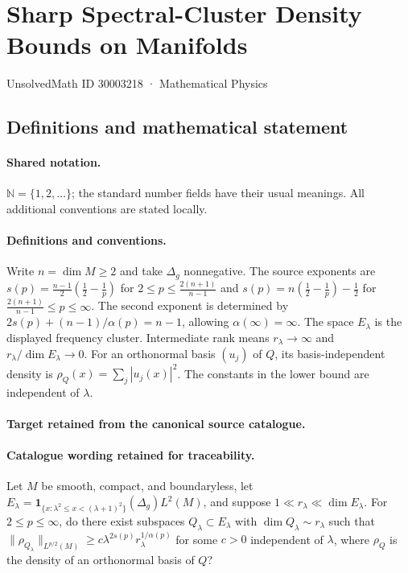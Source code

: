 \documentclass[11pt]{article}
\begin{document}
\setcounter{section}{30003217}
\section{Sharp Spectral-Cluster Density Bounds on Manifolds}\label{30003218}
{\small UnsolvedMath ID 30003218 · Mathematical Physics}
\subsection{Definitions and mathematical statement}

\paragraph{Shared notation.}$\mathbb N=\{1,2,\ldots\}$; the standard number fields have their usual meanings. All additional conventions are stated locally.


\paragraph{Definitions and conventions.}
Write $n=\dim M\geq2$ and take $\Delta_g$ nonnegative. The source exponents are $s(p)=\frac{n-1}{2}(\frac12-\frac1p)$ for $2\leq p\leq\frac{2(n+1)}{n-1}$ and $s(p)=n(\frac12-\frac1p)-\frac12$ for $\frac{2(n+1)}{n-1}\leq p\leq\infty$. The second exponent is determined by $2s(p)+(n-1)/\alpha(p)=n-1$, allowing $\alpha(\infty)=\infty$. The space $E_\lambda$ is the displayed frequency cluster. Intermediate rank means $r_\lambda\to\infty$ and $r_\lambda/\dim E_\lambda\to0$. For an orthonormal basis $(u_j)$ of $Q$, its basis-independent density is $\rho_Q(x)=\sum_j|u_j(x)|^2$. The constants in the lower bound are independent of $\lambda$.

\paragraph{Target retained from the canonical source catalogue.}
\paragraph{Catalogue wording retained for traceability.}
Let $M$ be smooth, compact, and boundaryless, let $E_\lambda=\mathbf{1}_{\{x:\lambda^2\leq x<(\lambda+1)^2\}}(\Delta_g)L^2(M)$, and suppose $1\ll r_\lambda\ll\dim E_\lambda$. For $2\leq p\leq\infty$, do there exist subspaces $Q_\lambda\subset E_\lambda$ with $\dim Q_\lambda\sim r_\lambda$ such that $\lVert\rho_{Q_\lambda}\rVert_{L^{p/2}(M)}\geq c\lambda^{2s(p)}r_\lambda^{1/\alpha(p)}$ for some $c>0$ independent of $\lambda$, where $\rho_Q$ is the density of an orthonormal basis of $Q$?
\end{document}
